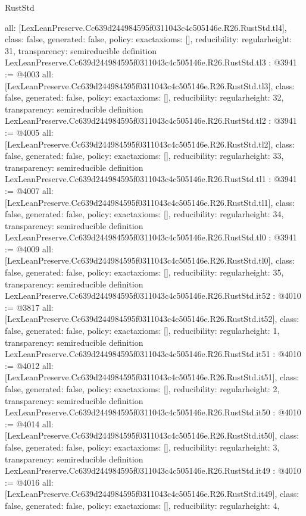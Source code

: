 \begin{lexlean}{RustStd}
\begin{coremodule}
{  all: [LexLeanPreserve.Cc639d244984595f0311043c4c505146e.R26.RustStd.tl4],
  class: false,
  generated: false,
  policy: exact{axioms: []},
  reducibility: regular{height: 31},
  transparency: semireducible
}
definition LexLeanPreserve.Cc639d244984595f0311043c4c505146e.R26.RustStd.tl3 : @3941 := @4003 {
  all: [LexLeanPreserve.Cc639d244984595f0311043c4c505146e.R26.RustStd.tl3],
  class: false,
  generated: false,
  policy: exact{axioms: []},
  reducibility: regular{height: 32},
  transparency: semireducible
}
definition LexLeanPreserve.Cc639d244984595f0311043c4c505146e.R26.RustStd.tl2 : @3941 := @4005 {
  all: [LexLeanPreserve.Cc639d244984595f0311043c4c505146e.R26.RustStd.tl2],
  class: false,
  generated: false,
  policy: exact{axioms: []},
  reducibility: regular{height: 33},
  transparency: semireducible
}
definition LexLeanPreserve.Cc639d244984595f0311043c4c505146e.R26.RustStd.tl1 : @3941 := @4007 {
  all: [LexLeanPreserve.Cc639d244984595f0311043c4c505146e.R26.RustStd.tl1],
  class: false,
  generated: false,
  policy: exact{axioms: []},
  reducibility: regular{height: 34},
  transparency: semireducible
}
definition LexLeanPreserve.Cc639d244984595f0311043c4c505146e.R26.RustStd.tl0 : @3941 := @4009 {
  all: [LexLeanPreserve.Cc639d244984595f0311043c4c505146e.R26.RustStd.tl0],
  class: false,
  generated: false,
  policy: exact{axioms: []},
  reducibility: regular{height: 35},
  transparency: semireducible
}
definition LexLeanPreserve.Cc639d244984595f0311043c4c505146e.R26.RustStd.it52 : @4010 := @3817 {
  all: [LexLeanPreserve.Cc639d244984595f0311043c4c505146e.R26.RustStd.it52],
  class: false,
  generated: false,
  policy: exact{axioms: []},
  reducibility: regular{height: 1},
  transparency: semireducible
}
definition LexLeanPreserve.Cc639d244984595f0311043c4c505146e.R26.RustStd.it51 : @4010 := @4012 {
  all: [LexLeanPreserve.Cc639d244984595f0311043c4c505146e.R26.RustStd.it51],
  class: false,
  generated: false,
  policy: exact{axioms: []},
  reducibility: regular{height: 2},
  transparency: semireducible
}
definition LexLeanPreserve.Cc639d244984595f0311043c4c505146e.R26.RustStd.it50 : @4010 := @4014 {
  all: [LexLeanPreserve.Cc639d244984595f0311043c4c505146e.R26.RustStd.it50],
  class: false,
  generated: false,
  policy: exact{axioms: []},
  reducibility: regular{height: 3},
  transparency: semireducible
}
definition LexLeanPreserve.Cc639d244984595f0311043c4c505146e.R26.RustStd.it49 : @4010 := @4016 {
  all: [LexLeanPreserve.Cc639d244984595f0311043c4c505146e.R26.RustStd.it49],
  class: false,
  generated: false,
  policy: exact{axioms: []},
  reducibility: regular{height: 4},
}
\end{coremodule}
\end{lexlean}
